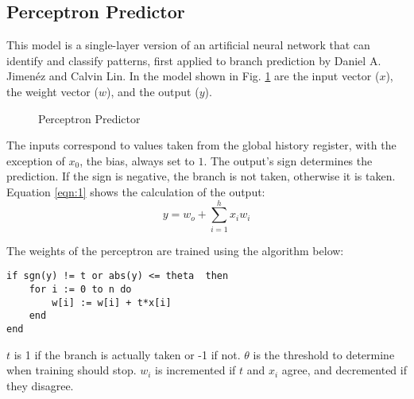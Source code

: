 \documentclass[conference]{IEEEtran}
\begin{document}
\subsection{Perceptron Predictor} \label{ssec:perceptron}
This model is a single-layer version of an artificial neural network that can identify and classify patterns, first applied to branch prediction by Daniel A. Jimen\'ez and Calvin Lin\cite{jimenez2001dynamic}. In the model shown in Fig. \ref{fig:perceptron} are the input vector ($x$), the weight vector ($w$), and the output ($y$).
\begin{figure}
    \centering
    \caption{Perceptron Predictor}
	\label{fig:perceptron}
\end{figure}
The inputs correspond to values taken from the global history register, with the exception of $x_0$, the bias, always set to $1$. The output's sign determines the prediction. If the sign is negative, the branch is not taken, otherwise it is taken. Equation \eqref{eqn:1} shows the calculation of the output:
\begin{equation}
    y = w_o + \sum_{i=1}^{h}{x_iw_i}
    \label{eqn:1}
\end{equation}

The weights of the perceptron are trained using the algorithm below:
\begin{lstlisting}
if sgn(y) != t or abs(y) <= theta  then
    for i := 0 to n do
        w[i] := w[i] + t*x[i]
    end
end
\end{lstlisting}
$t$ is 1 if the branch is actually taken or -1 if not. $\theta$ is the threshold to determine when training should stop. $w_i$ is incremented if $t$ and $x_i$ agree, and decremented if they disagree.
\end{document}
